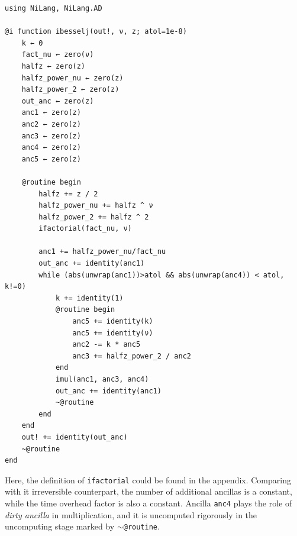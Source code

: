 \documentclass{article}
\newcommand{\<}{\langle}
\renewcommand{\>}{\rangle}
\theoremstyle{definition}\newtheorem{definition}{\textit{Definition}}
\begin{document}
\begin{minipage}{\columnwidth}
\begin{lstlisting}[multicols=2]
using NiLang, NiLang.AD

@i function ibesselj(out!, ν, z; atol=1e-8)
    k ← 0
    fact_nu ← zero(ν)
    halfz ← zero(z)
    halfz_power_nu ← zero(z)
    halfz_power_2 ← zero(z)
    out_anc ← zero(z)
    anc1 ← zero(z)
    anc2 ← zero(z)
    anc3 ← zero(z)
    anc4 ← zero(z)
    anc5 ← zero(z)

    @routine begin
        halfz += z / 2
        halfz_power_nu += halfz ^ ν
        halfz_power_2 += halfz ^ 2
        ifactorial(fact_nu, ν)

        anc1 += halfz_power_nu/fact_nu
        out_anc += identity(anc1)
        while (abs(unwrap(anc1))>atol && abs(unwrap(anc4)) < atol, k!=0)
            k += identity(1)
            @routine begin
                anc5 += identity(k)
                anc5 += identity(ν)
                anc2 -= k * anc5
                anc3 += halfz_power_2 / anc2
            end
            imul(anc1, anc3, anc4)
            out_anc += identity(anc1)
            ~@routine
        end
    end
    out! += identity(out_anc)
    ~@routine
end
\end{lstlisting}
\end{minipage}

Here, the definition of \texttt{ifactorial} could be found in the appendix. Comparing with it irreversible counterpart, the number of additional ancillas is a constant, while the time overhead factor is also a constant.
Ancilla \texttt{anc4} plays the role of \textit{dirty ancilla} in multiplication, and it is uncomputed rigorously in the uncomputing stage marked by \texttt{$\sim$@routine}.
\end{document}
